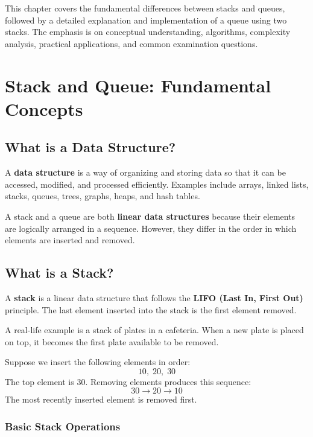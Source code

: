This chapter covers the fundamental differences between stacks and queues, followed by a detailed explanation and implementation of a queue using two stacks. The emphasis is on conceptual understanding, algorithms, complexity analysis, practical applications, and common examination questions.

\section{Stack and Queue: Fundamental Concepts}

\subsection{What is a Data Structure?}

A \textbf{data structure} is a way of organizing and storing data so that it can be accessed, modified, and processed efficiently. Examples include arrays, linked lists, stacks, queues, trees, graphs, heaps, and hash tables.

A stack and a queue are both \textbf{linear data structures} because their elements are logically arranged in a sequence. However, they differ in the order in which elements are inserted and removed.

\subsection{What is a Stack?}

A \textbf{stack} is a linear data structure that follows the \textbf{LIFO (Last In, First Out)} principle. The last element inserted into the stack is the first element removed.

A real-life example is a stack of plates in a cafeteria. When a new plate is placed on top, it becomes the first plate available to be removed.

Suppose we insert the following elements in order:
\[
10, \; 20, \; 30
\]
The top element is $30$. Removing elements produces this sequence:
\[
30 \longrightarrow 20 \longrightarrow 10
\]
The most recently inserted element is removed first.

\subsubsection{Basic Stack Operations}

